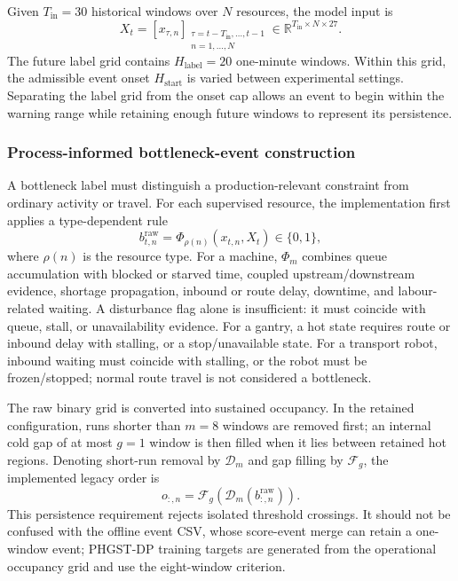 \documentclass[a4paper,fleqn]{cas-dc}
\begin{document}
Given $T_{\mathrm{in}}=30$ historical windows over $N$ resources, the model input is
\begin{equation}
X_t=\left[x_{\tau,n}\right]_
{\substack{\tau=t-T_{\mathrm{in}},\ldots,t-1\\n=1,\ldots,N}}
\in\mathbb{R}^{T_{\mathrm{in}}\times N\times 27}.
\end{equation}
The future label grid contains $H_{\mathrm{label}}=20$ one-minute windows. Within this grid, the admissible event onset $H_{\mathrm{start}}$ is varied between experimental settings. Separating the label grid from the onset cap allows an event to begin within the warning range while retaining enough future windows to represent its persistence.


\subsubsection{Process-informed bottleneck-event construction}

A bottleneck label must distinguish a production-relevant constraint from ordinary activity or travel. For each supervised resource, the implementation first applies a type-dependent rule
\begin{equation}
b^{\mathrm{raw}}_{t,n}=\Phi_{\rho(n)}(x_{t,n},X_t)\in\{0,1\},
\end{equation}
where $\rho(n)$ is the resource type. For a machine, $\Phi_m$ combines queue accumulation with blocked or starved time, coupled upstream/downstream evidence, shortage propagation, inbound or route delay, downtime, and labour-related waiting. A disturbance flag alone is insufficient: it must coincide with queue, stall, or unavailability evidence. For a gantry, a hot state requires route or inbound delay with stalling, or a stop/unavailable state. For a transport robot, inbound waiting must coincide with stalling, or the robot must be frozen/stopped; normal route travel is not considered a bottleneck.


The raw binary grid is converted into sustained occupancy. In the retained configuration, runs shorter than $m=8$ windows are removed first; an internal cold gap of at most $g=1$ window is then filled when it lies between retained hot regions. Denoting short-run removal by $\mathcal{D}_{m}$ and gap filling by $\mathcal{F}_{g}$, the implemented legacy order is
\begin{equation}
o_{:,n}=\mathcal{F}_{g}\!\left(\mathcal{D}_{m}
\left(b^{\mathrm{raw}}_{:,n}\right)\right).
\end{equation}
This persistence requirement rejects isolated threshold crossings. It should not be confused with the offline event CSV, whose score-event merge can retain a one-window event; PHGST-DP training targets are generated from the operational occupancy grid and use the eight-window criterion.
\end{document}
